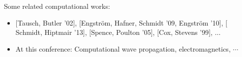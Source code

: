 \documentclass[10pt]{beamer}
\newcommand{\mycite}[1]{$[$#1$]$}
\begin{document}
\begin{frame}
%
%
%

\pause\pause\pause \vspace{-0.3cm}Some related computational works:
\begin{itemize} 
 \item  \mycite{Tausch, Butler '02}, \mycite{Engstr\"om, Hafner, Schmidt '09, Engstr\"om '10}, \mycite{Schmidt, Hiptmair '13}, \mycite{Spence, Poulton '05},  \mycite{Cox, Stevens '99}, $\ldots$ \pause
 \item At this conference: Computational wave propagation, electromagnetics, $\cdots$
\end{itemize}
\end{frame}
\end{document}
